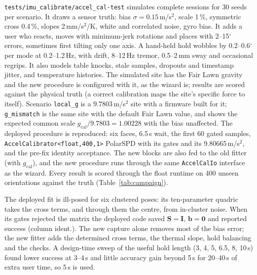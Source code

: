 \documentclass[conference]{IEEEtran}
\begin{document}
    \texttt{tests/imu\_calibrate/accel\_cal-test} simulates complete
    sessions for 30 seeds per scenario. It draws a sensor truth: bias
    $\sigma=0.15$\,m/s$^2$, scale 1\,\%, symmetric cross 0.4\,\%, slopes
    2\,mm/s$^2$/K, white and correlated noise, gyro bias. It adds a user who
    reacts, moves with minimum-jerk rotations and places with 2--15$^\circ$
    errors, sometimes first tilting only one axis. A hand-held hold wobbles
    by 0.2--0.6$^\circ$ per mode at 0.2--1.2\,Hz, with drift, 8--12\,Hz
    tremor, 0.5--2\,mm sway and occasional regrips. It also models table
    knocks, stale samples, dropouts and timestamp jitter, and temperature
    histories. The simulated site has the Fair Lawn gravity and the new
    procedure is configured with it, as the wizard is; results are scored
    against the physical truth (a correct calibration maps the site's
    specific force to itself). Scenario \texttt{local\_g} is a
    9.7803\,m/s$^2$ site with a firmware built for it; \texttt{g\_mismatch}
    is the same site with the default Fair Lawn value, and shows the
    expected common scale $g_\text{cal}/9.7803 = 1.00228$ with the bias
    unaffected. The deployed procedure is reproduced: six faces, 6.5\,s wait,
    the first 60 gated samples, \texttt{AccelCalibrator<float,400,1>}
    PolarSPD with its gates and its 9.80665\,m/s$^2$, and the pre-fix
    identity acceptance. The new blocks are also fed to the old fitter
    (with $g_\text{cal}$), and the new procedure runs through the
    same \texttt{AccelCalIo} interface as the wizard. Every result is scored
    through the float runtime on 400 unseen orientations against the truth
    (Table~\ref{tab:campaign}).

    The deployed fit is ill-posed for six clustered poses: its ten-parameter
    quadric takes the cross terms, and through them the centre, from
    in-cluster noise. When its gates rejected the matrix the deployed code
    saved $\mathbf{S}=\mathbf{I}$, $\mathbf{b}=\mathbf{0}$ and reported
    success (column ident.). The new capture alone removes most of the bias
    error; the new fitter adds the determined cross terms, the thermal
    slope, hold balancing and the checks. A design-time sweep of the useful
    hold length (3, 4, 5, 6.5, 8, 10\,s) found lower success at 3--4\,s and
    little accuracy gain beyond 5\,s for 20--40\,s of extra user time, so
    5\,s is used.

    \begin{table}[t]
        \centering
        \caption{Simulated accelerometer calibration (30 sessions per
        scenario; regenerated by CI from
        \texttt{calibrate\_accel\_campaign\_summary.csv}). Errors at the
        mean capture temperature on unseen orientations through the float
        runtime; cross is the largest symmetric cross-term error; time is
        the user time of the accelerometer holds.}
        \label{tab:campaign}
        \footnotesize
    \end{table}
\end{document}
